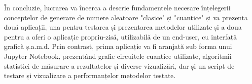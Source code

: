 În concluzie, lucrarea va încerca a descrie fundamentele necesare înțelegerii conceptelor de generare de numere aleatoare "clasice" și "cuantice" și va prezenta două aplicații, una pentru testarea și prezentarea metodelor utilizate și a doua pentru a oferi o aplicație propriu-zisă, utilizabilă de un end-user, cu interfață grafică ș.a.m.d. Prin contrast, prima aplicație va fi aranjată sub forma unui Jupyter Notebook, prezentând grafic circuitele cuantice utilizate, algoritmii statistici de măsurare a rezultatelor și diverse vizualizări, dar și un script de testare și vizualizare a performanțelor metodelor testate.




\renewcommand{\thesection}{\arabic{section}}
\renewcommand{\thesubsection}{\thesection.\arabic{subsection}}




